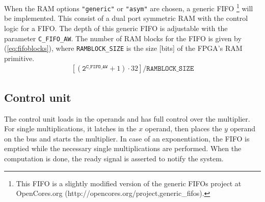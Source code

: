 When the RAM options \verb|"generic"| or \verb|"asym"| are chosen, a generic FIFO \footnote{This FIFO is a slightly
modified version of the generic FIFOs project at OpenCores.org (http://opencores.org/project,generic\_fifos).} will be
implemented.
This consist of a dual port symmetric RAM with the control logic for a FIFO. The depth of this generic FIFO is adjustable with the parameter \verb|C_FIFO_AW|. The number of RAM blocks for the FIFO is given by (\ref{eq:fifoblocks}), where
\verb|RAMBLOCK_SIZE| is the size [bits] of the FPGA's RAM primitive.
\begin{align}
	\left[\left(\mathtt{2^{C\_FIFO\_AW}}+1\right) \cdot 32 \right]/ \mathtt{RAMBLOCK\_SIZE} \label{eq:fifoblocks}
\end{align}

\subsection{Control unit}
The control unit loads in the operands and has full control over the multiplier. For single multiplications, it latches in 
the $x$ operand, then places the $y$ operand on the bus and starts the multiplier. In case of an exponentiation, the FIFO is 
emptied while the necessary single multiplications are performed. When the computation is done, the ready signal is 
asserted to notify the system.

\newpage
